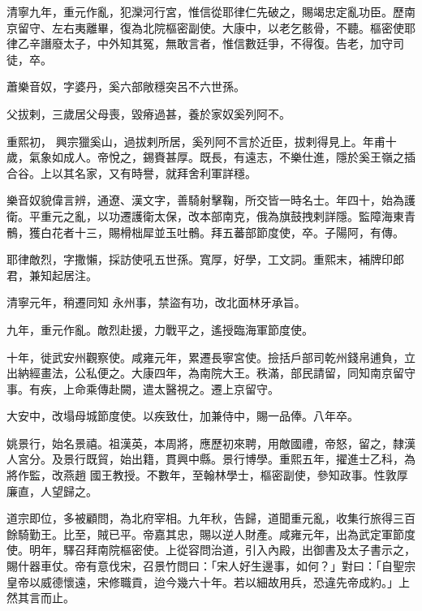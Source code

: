 \begin{pinyinscope}
 清寧九年，重元作亂，犯灤河行宮，惟信從耶律仁先破之，賜竭忠定亂功臣。歷南京留守、左右夷離畢，復為北院樞密副使。大康中，以老乞骸骨，不聽。樞密使耶律乙辛譖廢太子，中外知其冤，無敢言者，惟信數廷爭，不得復。告老，加守司徒，卒。



 蕭樂音奴，字婆丹，奚六部敞穩突呂不六世孫。



 父拔剌，三歲居父母喪，毀瘠過甚，養於家奴奚列阿不。



 重熙初，
 興宗獵奚山，過拔剌所居，奚列阿不言於近臣，拔剌得見上。年甫十歲，氣象如成人。帝悅之，錫賚甚厚。既長，有遠志，不樂仕進，隱於奚王嶺之插合谷。上以其名家，又有時譽，就拜舍利軍詳穩。



 樂音奴貌偉言辨，通遼、漢文字，善騎射擊鞠，所交皆一時名士。年四十，始為護衛。平重元之亂，以功遷護衛太保，改本部南克，俄為旗鼓拽剌詳隱。監障海東青鶻，獲白花者十三，賜榾柮犀並玉吐鶻。拜五蕃部節度使，卒。子陽阿，有傳。



 耶律敵烈，字撒懶，採訪使吼五世孫。寬厚，好學，工文詞。重熙末，補牌印郎君，兼知起居注。



 清寧元年，稍遷同知
 永州事，禁盜有功，改北面林牙承旨。



 九年，重元作亂。敵烈赴援，力戰平之，遙授臨海軍節度使。



 十年，徙武安州觀察使。咸雍元年，累遷長寧宮使。撿括戶部司乾州錢帛逋負，立出納經畫法，公私便之。大康四年，為南院大王。秩滿，部民請留，同知南京留守事。有疾，上命乘傳赴闕，遣太醫視之。遷上京留守。



 大安中，改塌母城節度使。以疾致仕，加兼侍中，賜一品俸。八年卒。



 姚景行，始名景禧。祖漢英，本周將，應歷初來聘，用敵國禮，帝怒，留之，隸漢人宮分。及景行既貿，始出籍，貫興中縣。景行博學。重熙五年，擢進士乙科，為將作監，改燕趙
 國王教授。不數年，至翰林學士，樞密副使，參知政事。性敦厚廉直，人望歸之。



 道宗即位，多被顧問，為北府宰相。九年秋，告歸，道聞重元亂，收集行旅得三百餘騎勤王。比至，賊已平。帝嘉其忠，賜以逆人財產。咸雍元年，出為武定軍節度使。明年，驛召拜南院樞密使。上從容問治道，引入內殿，出御書及太子書示之，賜什器車仗。帝有意伐宋，召景竹問曰：「宋人好生邊事，如何？」對曰：「自聖宗皇帝以威德懷遠，宋修職貢，迨今幾六十年。若以細故用兵，恐違先帝成約。」上然其言而止。




\end{pinyinscope}
